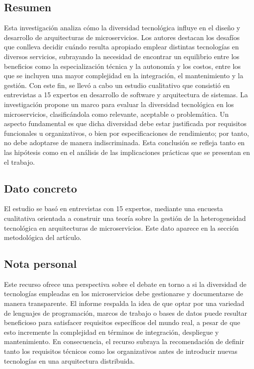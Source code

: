 \documentclass[11pt]{article}
\begin{document}
\subsection*{Resumen}
Esta investigación analiza cómo la diversidad tecnológica influye en el diseño y desarrollo de arquitecturas de microservicios. Los autores destacan los desafíos que conlleva decidir cuándo resulta apropiado emplear distintas tecnologías en diversos servicios, subrayando la necesidad de encontrar un equilibrio entre los beneficios como la especialización técnica y la autonomía y los costos, entre los que se incluyen una mayor complejidad en la integración, el mantenimiento y la gestión. Con este fin, se llevó a cabo un estudio cualitativo que consistió en entrevistas a 15 expertos en desarrollo de software y arquitectura de sistemas. La investigación propone un marco para evaluar la diversidad tecnológica en los microservicios, clasificándola como relevante, aceptable o problemática. Un aspecto fundamental es que dicha diversidad debe estar justificada por requisitos funcionales u organizativos, o bien por especificaciones de rendimiento; por tanto, no debe adoptarse de manera indiscriminada. Esta conclusión se refleja tanto en las hipótesis como en el análisis de las implicaciones prácticas que se presentan en el trabajo.

\subsection*{Dato concreto}
El estudio se basó en entrevistas con 15 expertos, mediante una encuesta cualitativa orientada a construir una teoría sobre la gestión de la heterogeneidad tecnológica en arquitecturas de microservicios. Este dato aparece en la sección metodológica del artículo.

\subsection*{Nota personal}
Este recurso ofrece una perspectiva sobre el debate en torno a si la diversidad de tecnologías empleadas en los microservicios debe gestionarse y documentarse de manera transparente. El informe respalda la idea de que optar por una variedad de lenguajes de programación, marcos de trabajo o bases de datos puede resultar beneficioso para satisfacer requisitos específicos del mundo real, a pesar de que esto incremente la complejidad en términos de integración, despliegue y mantenimiento. En consecuencia, el recurso subraya la recomendación de definir tanto los requisitos técnicos como los organizativos antes de introducir nuevas tecnologías en una arquitectura distribuida.
\end{document}
